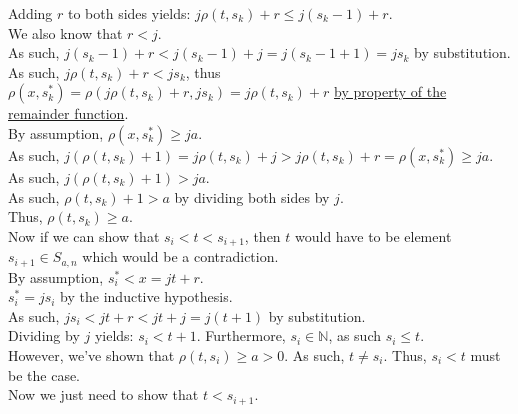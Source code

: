 \documentclass[a4paper,12pt]{article}
\begin{document}
\noindent Adding $r$ to both sides yields: $j \rho(t, s_k) + r \leq j(s_k - 1) + r$.\\

\noindent We also know that $r < j$.\\

\noindent As such, $j(s_k - 1) + r < j(s_k - 1) + j = j(s_k - 1 + 1) = js_k$ by substitution.\\

\noindent As such, $j \rho(t, s_k) + r < js_k$, thus $\rho(x, s^*_k) = \rho(j \rho(t, s_k) + r, js_k) = j \rho(t, s_k) + r$ \hyperlink{remainder_properties}{by property of the remainder function}.\\

\noindent By assumption, $\rho(x, s^*_k) \geq ja$.\\

\noindent As such, $j(\rho(t, s_k) + 1) = j \rho(t, s_k) + j > j \rho(t, s_k) + r  = \rho(x, s^*_k) \geq ja$.\\

\noindent As such, $j(\rho(t, s_k) + 1) > ja$.\\

\noindent As such, $\rho(t, s_k) + 1 > a$ by dividing both sides by $j$.\\

\noindent Thus, $\rho(t, s_k) \geq a$.\\

\noindent Now if we can show that $s_i < t < s_{i+1}$, then $t$ would have to be element $s_{i + 1} \in S_{a, n}$ which would be a contradiction.\\

\noindent By assumption, $s^*_i < x = jt + r$.\\

\noindent $s^*_i = js_i$ by the inductive hypothesis.\\

\noindent As such, $js_i < jt + r < jt + j = j(t + 1)$ by substitution.\\

\noindent Dividing by $j$ yields: $s_i < t + 1$. Furthermore, $s_i \in \mathbb{N}$, as such $s_i \leq t$.\\

\noindent However, we've shown that $\rho(t, s_i) \geq a > 0$. As such, $t \neq s_i$. Thus, $s_i < t$ must be the case.\\

\noindent Now we just need to show that $t < s_{i + 1}$.\\
\end{document}
